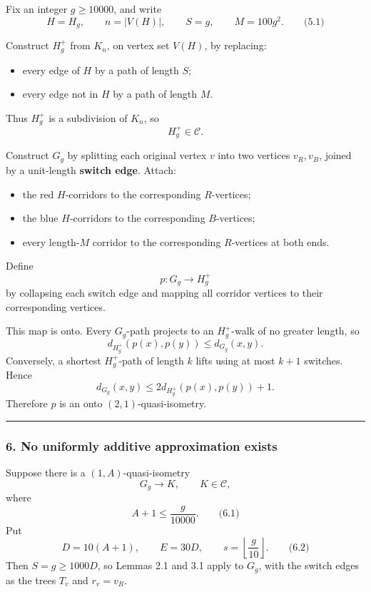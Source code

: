 \documentclass[
  11pt,
  a4paper,
]{article}
\providecommand{\tightlist}{%
  \setlength{\itemsep}{0pt}\setlength{\parskip}{0pt}}
\begin{document}
Fix an integer \(g\ge10000\), and write \[
H=H_g,\qquad n=|V(H)|,\qquad S=g,\qquad M=100g^2.
\qquad\text{(5.1)}
\]

Construct \(H_g^+\) from \(K_n\), on vertex set \(V(H)\), by replacing:

\begin{itemize}
\tightlist
\item
  every edge of \(H\) by a path of length \(S\);
\item
  every edge not in \(H\) by a path of length \(M\).
\end{itemize}

Thus \(H_g^+\) is a subdivision of \(K_n\), so \[
H_g^+\in\mathcal C.
\]

Construct \(G_g\) by splitting each original vertex \(v\) into two
vertices \(v_R,v_B\), joined by a unit-length \textbf{switch edge}.
Attach:

\begin{itemize}
\tightlist
\item
  the red \(H\)-corridors to the corresponding \(R\)-vertices;
\item
  the blue \(H\)-corridors to the corresponding \(B\)-vertices;
\item
  every length-\(M\) corridor to the corresponding \(R\)-vertices at
  both ends.
\end{itemize}

Define \[
p:G_g\to H_g^+
\] by collapsing each switch edge and mapping all corridor vertices to
their corresponding vertices.

This map is onto. Every \(G_g\)-path projects to an \(H_g^+\)-walk of no
greater length, so \[
d_{H_g^+}(p(x),p(y))\le d_{G_g}(x,y).
\] Conversely, a shortest \(H_g^+\)-path of length \(k\) lifts using at
most \(k+1\) switches. Hence \[
d_{G_g}(x,y)\le2d_{H_g^+}(p(x),p(y))+1.
\] Therefore \(p\) is an onto \((2,1)\)-quasi-isometry.

\begin{center}\rule{0.5\linewidth}{0.5pt}\end{center}

\subsubsection{6. No uniformly additive approximation
exists}\label{no-uniformly-additive-approximation-exists}

Suppose there is a \((1,A)\)-quasi-isometry \[
G_g\to K,\qquad K\in\mathcal C,
\] where \[
A+1\le \frac{g}{10000}.
\qquad\text{(6.1)}
\] Put \[
D=10(A+1),\qquad E=30D,\qquad
s=\left\lfloor\frac g{10}\right\rfloor.
\qquad\text{(6.2)}
\] Then \(S=g\ge1000D\), so Lemmas 2.1 and 3.1 apply to \(G_g\), with
the switch edges as the trees \(T_v\) and \(r_v=v_R\).
\end{document}
